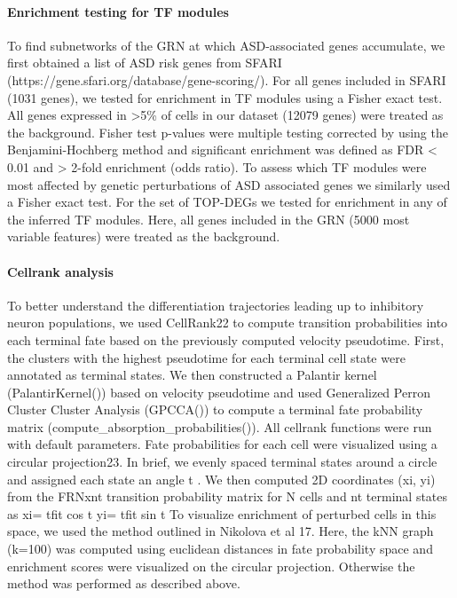 \paragraph{Enrichment testing for TF modules}
To find subnetworks of the GRN at which ASD-associated genes accumulate, we first obtained a list of ASD risk genes from SFARI \\(https://gene.sfari.org/database/gene-scoring/). For all genes included in SFARI (1031 genes), we tested for enrichment in TF modules using a Fisher exact test. All genes expressed in >5\% of cells in our dataset (12079 genes) were treated as the background. Fisher test p-values were multiple testing corrected by using the Benjamini-Hochberg method and significant enrichment was defined as FDR < 0.01 and > 2-fold enrichment (odds ratio). To assess which TF modules were most affected by genetic perturbations of ASD associated genes we similarly used a Fisher exact test. For the set of TOP-DEGs we tested for enrichment in any of the inferred TF modules. Here, all genes included in the GRN (5000 most variable features) were treated as the background.  

\paragraph{Cellrank analysis}
To better understand the differentiation trajectories leading up to inhibitory neuron populations, we used CellRank22 to compute transition probabilities into each terminal fate based on the previously computed velocity pseudotime. First, the clusters with the highest pseudotime for each terminal cell state were annotated as terminal states. We then constructed a Palantir kernel (PalantirKernel()) based on velocity pseudotime and used Generalized Perron Cluster Cluster Analysis (GPCCA()) to compute a terminal fate probability matrix (compute\_absorption\_probabilities()). All cellrank functions were run with default parameters. Fate probabilities for each cell were visualized using a circular projection23. In brief, we evenly spaced terminal states around a circle and assigned each state an angle t . We then computed 2D coordinates (xi, yi) from the FRNxnt  transition probability matrix for N cells and nt  terminal states as 
xi= tfit cos t 
yi= tfit sin t 
To visualize enrichment of perturbed cells in this space, we used the method outlined in Nikolova et al 17.  Here, the kNN graph (k=100) was computed using euclidean distances in fate probability space and enrichment scores were visualized on the circular projection. Otherwise the method was performed as described above.

